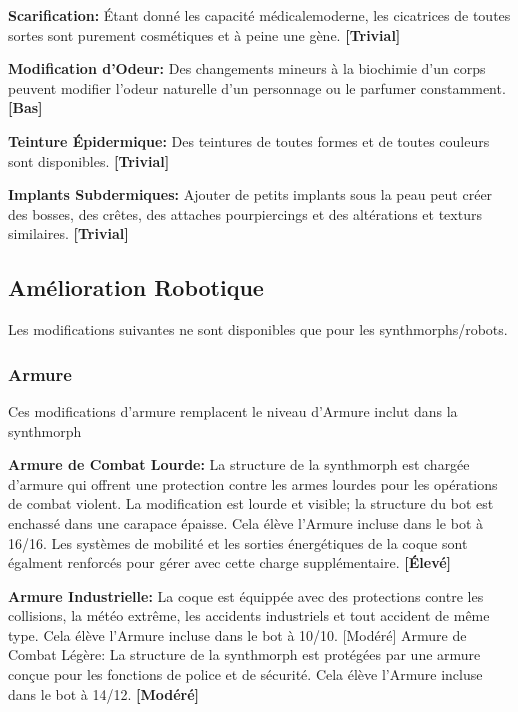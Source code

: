 {{\textbf{Scarification:} Étant donné les capacité médicalemoderne, les cicatrices de toutes sortes sont purement cosmétiques et à peine une gène. \textbf{[Trivial]} 

\textbf{Modification d'Odeur:} Des changements mineurs à la biochimie d'un corps peuvent modifier l'odeur naturelle d'un personnage ou le parfumer constamment. \textbf{[Bas]} 

\textbf{Teinture Épidermique:} Des teintures de toutes formes et de toutes couleurs sont disponibles. \textbf{[Trivial]} 

\textbf{Implants Subdermiques:} Ajouter de petits implants sous la peau peut créer des bosses, des crêtes, des attaches pourpiercings et des altérations et texturs similaires. \textbf{[Trivial]} 



\subsection{Amélioration Robotique} \label{sec:robotic-enhancements} 

Les modifications suivantes ne sont disponibles que pour les synthmorphs/robots. 

\subsubsection{Armure} 

Ces modifications d'armure remplacent le niveau d'Armure inclut dans la synthmorph 

\textbf{Armure de Combat Lourde:} La structure de la synthmorph est chargée d'armure qui offrent une protection contre les armes lourdes pour les opérations de combat violent. La modification est lourde et visible; la structure du bot est enchassé dans une carapace épaisse. Cela élève l'Armure incluse dans le bot à 16/16. Les systèmes de mobilité et les sorties énergétiques de la coque sont égalment renforcés pour gérer avec cette charge supplémentaire. \textbf{[Élevé]} 

\textbf{Armure Industrielle:} La coque est équippée avec des protections contre les collisions, la météo extrême, les accidents industriels et tout accident de même type. Cela élève l'Armure incluse dans le bot à 10/10. [Modéré] Armure de Combat Légère: La structure de la synthmorph est protégées par une armure conçue pour les fonctions de police et de sécurité. Cela élève l'Armure incluse dans le bot à 14/12. \textbf{[Modéré]} 

}}

